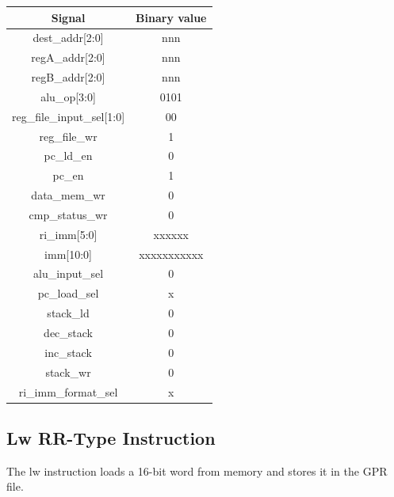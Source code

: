 \documentclass{article}
\begin{document}
\begin{par}
	\begin{center}
		\begin{tabular}{|c|c|}
			\hline 
			\textbf{Signal} & \textbf{Binary value} \\ 
			\hline 
			dest\_addr[2:0] & nnn \\ 
			\hline 
			regA\_addr[2:0] & nnn \\ 
			\hline 
			regB\_addr[2:0] & nnn \\ 
			\hline 
			alu\_op[3:0] & 0101 \\ 
			\hline 
			reg\_file\_input\_sel[1:0] & 00 \\ 
			\hline 
			reg\_file\_wr & 1 \\ 
			\hline 
			pc\_ld\_en & 0 \\ 
			\hline 
			pc\_en & 1 \\ 
			\hline 
			data\_mem\_wr & 0 \\ 
			\hline 
			cmp\_status\_wr & 0 \\ 
			\hline 
			ri\_imm[5:0] & xxxxxx \\ 
			\hline 
			imm[10:0] & xxxxxxxxxxx \\ 
			\hline 
			alu\_input\_sel & 0 \\ 
			\hline 
			pc\_load\_sel & x \\ 
			\hline 
			stack\_ld & 0 \\ 
			\hline 
			dec\_stack & 0 \\ 
			\hline 
			inc\_stack & 0 \\ 
			\hline 
			stack\_wr & 0 \\ 
			\hline 
			ri\_imm\_format\_sel & x \\ 
			\hline 
		\end{tabular} 
	\end{center}

	\newpage
	\subsection{Lw RR-Type Instruction}
	
	The lw instruction loads a 16-bit word from memory and stores it in the GPR file. 
	

\end{par}
\end{document}
